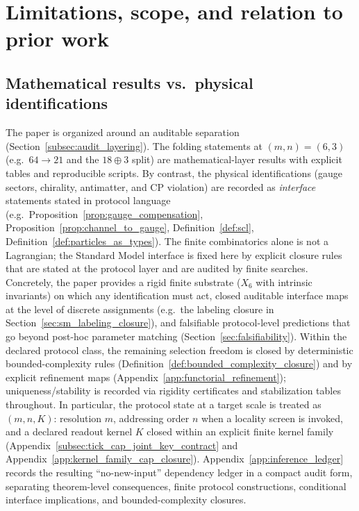 \section{Limitations, scope, and relation to prior work}
\label{sec:limitations_related_work}

\subsection{Mathematical results vs.\ physical identifications}
The paper is organized around an auditable separation (Section~\ref{subsec:audit_layering}).
The folding statements at $(m,n)=(6,3)$ (e.g.\ $64\to 21$ and the $18\oplus 3$ split) are mathematical-layer results with explicit tables and reproducible scripts.
By contrast, the physical identifications (gauge sectors, chirality, antimatter, and CP violation) are recorded as \emph{interface} statements stated in protocol language (e.g.\ Proposition~\ref{prop:gauge_compensation}, Proposition~\ref{prop:channel_to_gauge}, Definition~\ref{def:scl}, Definition~\ref{def:particles_as_types}).
The finite combinatorics alone is not a Lagrangian; the Standard Model interface is fixed here by explicit closure rules that are stated at the protocol layer and are audited by finite searches.
Concretely, the paper provides a rigid finite substrate ($X_6$ with intrinsic invariants) on which any identification must act, closed auditable interface maps at the level of discrete assignments (e.g.\ the labeling closure in Section~\ref{sec:sm_labeling_closure}), and falsifiable protocol-level predictions that go beyond post-hoc parameter matching (Section~\ref{sec:falsifiability}).
Within the declared protocol class, the remaining selection freedom is closed by deterministic bounded-complexity rules (Definition~\ref{def:bounded_complexity_closure}) and by explicit refinement maps (Appendix~\ref{app:functorial_refinement}); uniqueness/stability is recorded via rigidity certificates and stabilization tables throughout.
In particular, the protocol state at a target scale is treated as $(m,n,K)$: resolution $m$, addressing order $n$ when a locality screen is invoked, and a declared readout kernel $K$ closed within an explicit finite kernel family (Appendix~\ref{subsec:tick_cap_joint_key_contract} and Appendix~\ref{app:kernel_family_cap_closure}).
Appendix~\ref{app:inference_ledger} records the resulting ``no-new-input'' dependency ledger in a compact audit form, separating theorem-level consequences, finite protocol constructions, conditional interface implications, and bounded-complexity closures.

